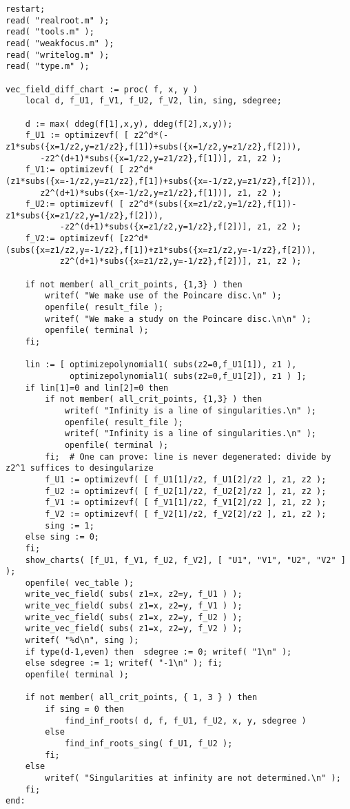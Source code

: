\documentclass[a4paper,10pt]{article}
\begin{document}
\begin{lstlisting}[name=infinity]
restart;
read( "realroot.m" );
read( "tools.m" );
read( "weakfocus.m" );
read( "writelog.m" );
read( "type.m" );

vec_field_diff_chart := proc( f, x, y )
    local d, f_U1, f_V1, f_U2, f_V2, lin, sing, sdegree;

    d := max( ddeg(f[1],x,y), ddeg(f[2],x,y));
    f_U1 := optimizevf( [ z2^d*(-z1*subs({x=1/z2,y=z1/z2},f[1])+subs({x=1/z2,y=z1/z2},f[2])),
       -z2^(d+1)*subs({x=1/z2,y=z1/z2},f[1])], z1, z2 );
    f_V1:= optimizevf( [ z2^d*(z1*subs({x=-1/z2,y=z1/z2},f[1])+subs({x=-1/z2,y=z1/z2},f[2])),
       z2^(d+1)*subs({x=-1/z2,y=z1/z2},f[1])], z1, z2 );
    f_U2:= optimizevf( [ z2^d*(subs({x=z1/z2,y=1/z2},f[1])-z1*subs({x=z1/z2,y=1/z2},f[2])),
           -z2^(d+1)*subs({x=z1/z2,y=1/z2},f[2])], z1, z2 );
    f_V2:= optimizevf( [z2^d*(subs({x=z1/z2,y=-1/z2},f[1])+z1*subs({x=z1/z2,y=-1/z2},f[2])),
           z2^(d+1)*subs({x=z1/z2,y=-1/z2},f[2])], z1, z2 );

    if not member( all_crit_points, {1,3} ) then
        writef( "We make use of the Poincare disc.\n" );
        openfile( result_file );
        writef( "We make a study on the Poincare disc.\n\n" );
        openfile( terminal );
    fi;

    lin := [ optimizepolynomial1( subs(z2=0,f_U1[1]), z1 ),
             optimizepolynomial1( subs(z2=0,f_U1[2]), z1 ) ];
    if lin[1]=0 and lin[2]=0 then
        if not member( all_crit_points, {1,3} ) then
            writef( "Infinity is a line of singularities.\n" );
            openfile( result_file );
            writef( "Infinity is a line of singularities.\n" );
            openfile( terminal );
        fi;  # One can prove: line is never degenerated: divide by z2^1 suffices to desingularize
        f_U1 := optimizevf( [ f_U1[1]/z2, f_U1[2]/z2 ], z1, z2 );
        f_U2 := optimizevf( [ f_U2[1]/z2, f_U2[2]/z2 ], z1, z2 );
        f_V1 := optimizevf( [ f_V1[1]/z2, f_V1[2]/z2 ], z1, z2 );
        f_V2 := optimizevf( [ f_V2[1]/z2, f_V2[2]/z2 ], z1, z2 );
        sing := 1;
    else sing := 0;
    fi;
    show_charts( [f_U1, f_V1, f_U2, f_V2], [ "U1", "V1", "U2", "V2" ] );
    openfile( vec_table );
    write_vec_field( subs( z1=x, z2=y, f_U1 ) );
    write_vec_field( subs( z1=x, z2=y, f_V1 ) );
    write_vec_field( subs( z1=x, z2=y, f_U2 ) );
    write_vec_field( subs( z1=x, z2=y, f_V2 ) );
    writef( "%d\n", sing );
    if type(d-1,even) then  sdegree := 0; writef( "1\n" );
    else sdegree := 1; writef( "-1\n" ); fi;
    openfile( terminal );

    if not member( all_crit_points, { 1, 3 } ) then
        if sing = 0 then
            find_inf_roots( d, f, f_U1, f_U2, x, y, sdegree )
        else
            find_inf_roots_sing( f_U1, f_U2 );
        fi;
    else
        writef( "Singularities at infinity are not determined.\n" );
    fi;
end:
\end{lstlisting}
\end{document}
